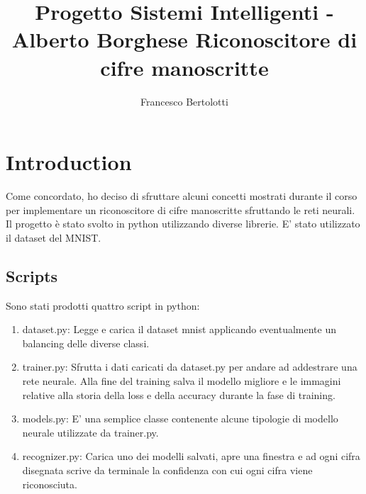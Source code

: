 \documentclass[12pt]{article}
\begin{document}
 
\title{Progetto Sistemi Intelligenti - Alberto Borghese
Riconoscitore di cifre manoscritte}%
\author{Francesco Bertolotti} %

\maketitle
\newpage
\tableofcontents
\newpage

\section{Introduction}
Come concordato, ho deciso di sfruttare alcuni concetti mostrati
durante il corso per implementare un riconoscitore di cifre manoscritte 
sfruttando le reti neurali. Il progetto è stato svolto in python utilizzando diverse librerie.
E' stato utilizzato il dataset del MNIST.\\


\subsection{Scripts}
Sono stati prodotti quattro script in python: 
\begin{enumerate}
    \item dataset.py: Legge e carica il dataset mnist applicando eventualmente
                      un balancing delle diverse classi.
    \item trainer.py: Sfrutta i dati caricati da dataset.py per andare
                      ad addestrare una rete neurale. Alla fine del training
                      salva il modello migliore e le immagini relative alla
                      storia della loss e della accuracy durante la fase di training.
    \item models.py: E' una semplice classe contenente alcune tipologie di modello
                     neurale utilizzate da trainer.py.
    \item recognizer.py: Carica uno dei modelli salvati, apre una finestra
                         e ad ogni cifra disegnata scrive da terminale la confidenza
                         con cui ogni cifra viene riconosciuta. 
\end{enumerate}
\end{document}
